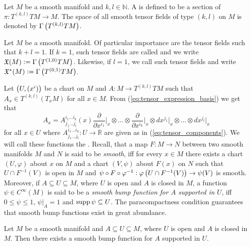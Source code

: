 \begin{definition}
	Let $M$ be a smooth manifold and $k,l \in \mathbb{N}$. A  is defined to be a section of $\pi : T^{(k,l)}TM \to M$. The space of all smooth tensor fields of type $(k,l)$ on $M$ is denoted by $\Gamma\del[1]{T^{(k,l)}TM}$.
\end{definition}

\begin{example}
	\label{ex:vector_and_covector_fields}
	Let $M$ be a smooth manifold. Of particular importance are the tensor fields such that $k + l = 1$. If $k = 1$, such tensor fields are called  and we write $\mathfrak{X}(M) := \Gamma\del[1]{T^{(1,0)}TM}$. Likewise, if $l = 1$, we call such tensor fields  and write $\mathfrak{X}^*(M) := \Gamma\del[1]{T^{(0,1)}TM}$.
\end{example}

Let $\del[1]{U,(x^i)}$ be a chart on $M$ and $A : M \to T^{(k,l)}TM$ such that $A_x \in T^{(k,l)}(T_xM)$ for all $x \in M$. From (\ref{eq:tensor_expression_basis}) we get that
\begin{equation*}
	A_x = A^{i_1\dots i_k}_{j_1\dots j_l}(x)\frac{\partial}{\partial x^{i_1}}\bigg\vert_x \otimes \dots \otimes \frac{\partial}{\partial x^{i_k}}\bigg\vert_x \otimes dx^{j_1}\vert_x \otimes \dots \otimes dx^{j_l}\vert_x
\end{equation*}
\noindent for all $x \in U$ where $A^{i_1\dots i_k}_{j_1\dots j_l} : U \to \mathbb{R}$ are given as in (\ref{eq:tensor_components}). We will call these functions the . Recall, that a map $F : M \to N$ between two smooth manifolds $M$ and $N$ is said to be \emph{smooth}, iff for every $x \in M$ there exists a chart $(U,\varphi)$ about $x$ on $M$ and a chart $(V,\psi)$ about $F(x)$ on $N$ such that $U \cap F^{-1}(V)$ is open in $M$ and $\psi \circ F \circ \varphi^{-1} : \varphi\del[1]{U \cap F^{-1}(V)} \to \psi(V)$ is smooth. Moreover, if $A \subseteq U \subseteq M$, where $U$ is open and $A$ is closed in $M$, a function $\psi \in C^\infty(M)$ is said to be a \emph{smooth bump function for $A$ supported in $U$}, iff $0 \leq \psi \leq 1$, $\psi \vert_A = 1$ and $\operatorname{supp} \psi \subseteq U$. The paracompactness condition guarantees that smooth bump functions exist in great abundance.

\begin{proposition}
	\label{prop:existence_smooth_bump_functions}
	Let $M$ be a smooth manifold and $A \subseteq U \subseteq M$, where $U$ is open and $A$ is closed in $M$. Then there exists a smooth bump function for $A$ supported in $U$. 	
\end{proposition}

